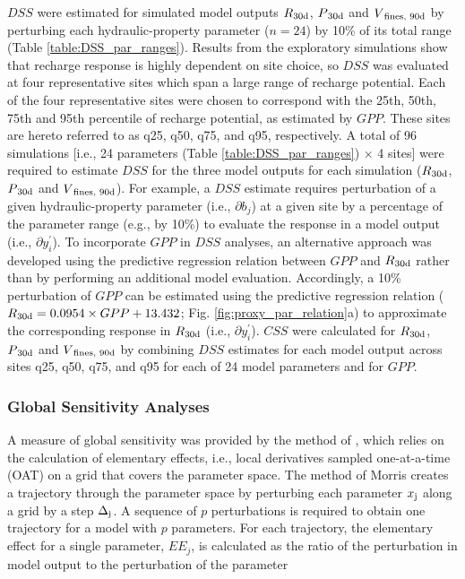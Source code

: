 $DSS$ were estimated for simulated model outputs $R\textsubscript{30d}$, $P\textsubscript{30d}$ and $V\textsubscript{fines, 90d}$ by perturbing each hydraulic-property parameter ($n = 24$) by 10\% of its total range (Table \ref{table:DSS_par_ranges}). Results from the exploratory simulations show that recharge response is highly dependent on site choice, so $DSS$ was evaluated at four representative sites which span a large range of recharge potential. Each of the four representative sites were chosen to correspond with the 25th, 50th, 75th and 95th percentile of recharge potential, as estimated by $GPP$. These sites are hereto referred to as q25, q50, q75, and q95, respectively. A total of 96 simulations [i.e., 24 parameters (Table \ref{table:DSS_par_ranges}) $\times$ 4 sites] were required to estimate $DSS$ for the three model outputs for each simulation ($R\textsubscript{30d}$, $P\textsubscript{30d}$ and $V\textsubscript{fines, 90d}$). For example, a $DSS$ estimate requires perturbation of a given hydraulic-property parameter (i.e., $\partial b_j$) at a given site by a percentage of the parameter range (e.g., by 10\%) to evaluate the response in a model output (i.e., $\partial y_i^'$). To incorporate $GPP$ in $DSS$ analyses, an alternative approach was developed using the predictive regression relation between $GPP$ and $R\textsubscript{30d}$ rather than by performing an additional model evaluation. Accordingly, a 10\% perturbation of $GPP$ can be estimated using the predictive regression relation ($R\textsubscript{30d} = 0.0954 \times GPP + 13.432$; Fig. \ref{fig:proxy_par_relation}a) to approximate the corresponding response in $R\textsubscript{30d}$ (i.e., $\partial y_i^'$). $CSS$ were calculated for $R\textsubscript{30d}$, $P\textsubscript{30d}$ and $V\textsubscript{fines, 90d}$ by combining $DSS$ estimates for each model output across sites q25, q50, q75, and q95 for each of 24 model parameters and for $GPP$.

\subsubsection{Global Sensitivity Analyses} \label{sssec:MM_global_sensitivity}
A measure of global sensitivity was provided by the method of \cite{morris1991factorial}, which relies on the calculation of elementary effects, i.e., local derivatives sampled one-at-a-time (OAT) on a grid that covers the parameter space. The method of Morris creates a trajectory through the parameter space by perturbing each parameter $x\textsubscript{j}$ along a grid by a step $\Delta\textsubscript{j}$. A sequence of $p$ perturbations is required to obtain one trajectory for a model with $p$ parameters. For each trajectory, the elementary effect for a single parameter, $EE_j$, is calculated as the ratio of the perturbation in model output to the perturbation of the parameter

